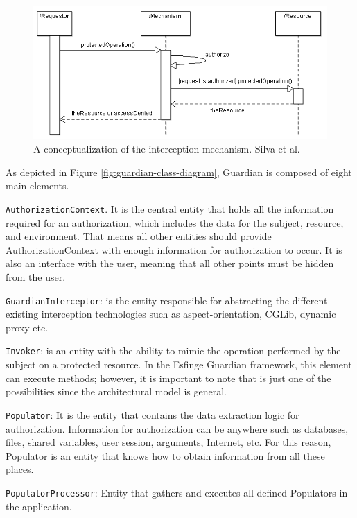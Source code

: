 \documentclass[sigconf]{acmart}
\begin{document}
\begin{figure}
  \centering
  \includegraphics[scale=0.5]{img/interception-mechanism.png}
  \caption{A conceptualization of the interception mechanism. Silva et al. \cite{Silva2013}}
  \label{fig:interception-mechanism}
\end{figure}

As depicted in Figure \ref{fig:guardian-class-diagram}, Guardian is composed of eight main elements.

\noindent \verb|AuthorizationContext|. It is the central entity that holds all the information required for an authorization, which includes the data for the subject, resource, and environment. That means all other entities should provide AuthorizationContext with enough information for authorization to occur. It is also an interface with the user, meaning that all other points must be hidden from the user.

\noindent \verb|GuardianInterceptor|: is the entity responsible for abstracting the different existing interception technologies such as \linebreak aspect-orientation, CGLib, dynamic proxy etc.


\noindent \verb|Invoker|: is an entity with the ability to mimic the operation performed by the subject on a protected resource. In the Esfinge \linebreak Guardian framework, this element can execute methods; however, it is important to note that is just one of the possibilities since the architectural model is general.


\noindent \verb|Populator|: It is the entity that contains the data extraction logic for authorization. Information for authorization can be anywhere such as databases, files, shared variables, user session, arguments, Internet, etc. For this reason, Populator is an entity that knows how to obtain information from all these places.


\noindent \verb|PopulatorProcessor|: Entity that gathers and executes all defined Populators in the application.
\end{document}

